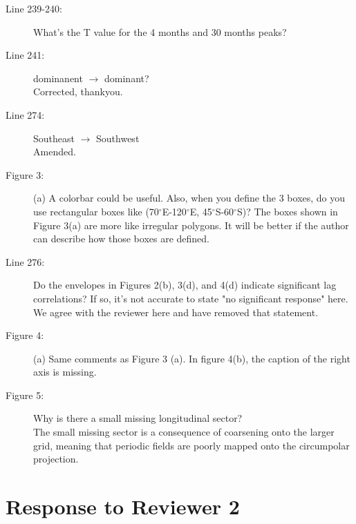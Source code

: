 \documentclass[11pt]{article}
\begin{document}
{\begin{description}
\item[Line 239-240:] What's the T value for the 4 months and 30 months peaks? \\
{\color{black}  }

\item[Line 241:] dominanent $\to$ dominant?\\
{\color{black} Corrected, thankyou. }

\item[Line 274:] Southeast $\to$ Southwest\\
{\color{black} Amended. }

\item[Figure 3:] (a) A colorbar could be useful. Also, when you define the 3 boxes, do you use rectangular boxes like (70$^\circ$E-120$^\circ$E, 45$^\circ$S-60$^\circ$S)? The boxes shown in Figure 3(a) are more like irregular polygons. It will be better if the author can describe how those boxes are defined. \\
{\color{black}  }

\item[Line 276:] Do the envelopes in Figures 2(b), 3(d), and 4(d) indicate significant lag correlations? If so, it's not accurate to state "no significant response" here.\\
{\color{black} We agree with the reviewer here and have removed that statement. }

\item[Figure 4:] (a) Same comments as Figure 3 (a). In figure 4(b), the caption of the right axis is missing. \\
{\color{black}  }

\item[Figure 5:] Why is there a small missing longitudinal sector?\\
{\color{black} The small missing sector is a consequence of coarsening onto the larger grid, meaning that periodic fields are poorly mapped onto the circumpolar projection. }

\end{description}
}

\newpage

\section*{Response to Reviewer 2}
\end{document}
